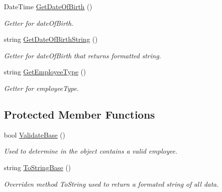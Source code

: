\begin{DoxyCompactItemize}
Date\+Time \hyperlink{class_all_employees_1_1_employee_a98f7200d68ab6a59f4e3283b8f81ce28}{Get\+Date\+Of\+Birth} ()
\begin{DoxyCompactList}\small\item\em Getter for date\+Of\+Birth. \end{DoxyCompactList}\item 
string \hyperlink{class_all_employees_1_1_employee_a2c310cf42cb87541a5fde6771e667212}{Get\+Date\+Of\+Birth\+String} ()
\begin{DoxyCompactList}\small\item\em Getter for date\+Of\+Birth that returns formatted string. \end{DoxyCompactList}\item 
string \hyperlink{class_all_employees_1_1_employee_a39116fe8a1dcc18735c92c1a3fcb579e}{Get\+Employee\+Type} ()
\begin{DoxyCompactList}\small\item\em Getter for employee\+Type. \end{DoxyCompactList}\end{DoxyCompactItemize}
\subsection*{Protected Member Functions}
\begin{DoxyCompactItemize}
\item 
bool \hyperlink{class_all_employees_1_1_employee_af679e8b4c683b9e94bec085062e5c88e}{Validate\+Base} ()
\begin{DoxyCompactList}\small\item\em Used to determine in the object contains a valid employee. \end{DoxyCompactList}\item 
string \hyperlink{class_all_employees_1_1_employee_a9e957826e327579e190cd5075789d1a9}{To\+String\+Base} ()
\begin{DoxyCompactList}\small\item\em Overriden method To\+String used to return a formated string of all data. \end{DoxyCompactList}\end{DoxyCompactItemize}
